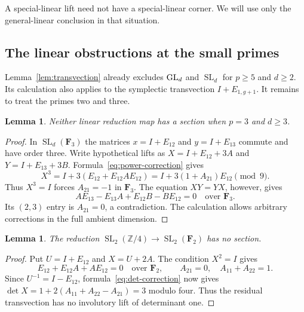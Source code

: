 \documentclass[11pt]{article}
\DeclareMathOperator{\SL}{SL}\DeclareMathOperator{\Sp}{Sp}
\newtheorem{lemma}[theorem]{Lemma}\newtheorem{proposition}[theorem]{Proposition}
\theoremstyle{definition}\newtheorem{definition}[theorem]{Definition}
\theoremstyle{remark}\newtheorem{remark}[theorem]{Remark}
\begin{document}
A special-linear lift need not have a special-linear corner. We will use
only the general-linear conclusion in that situation.

\subsection{The linear obstructions at the small primes}

Lemma~\ref{lem:transvection} already excludes $\operatorname{GL}_d$ and $\SL_d$ for
$p\geq5$ and $d\geq2$. Its calculation also applies to the symplectic
transvection $I+E_{1,g+1}$. It remains to treat the primes two and three.

\begin{lemma}\label{lem:three-linear}
Neither linear reduction map has a section when $p=3$ and $d\geq3$.
\end{lemma}
\begin{proof}
In $\SL_d(\mathbf F_3)$ the matrices $x=I+E_{12}$ and $y=I+E_{13}$
commute and have order three. Write hypothetical lifts as
$X=I+E_{12}+3A$ and $Y=I+E_{13}+3B$.
Formula~\eqref{eq:power-correction} gives
\[
 X^3=I+3(E_{12}+E_{12}AE_{12})
     =I+3(1+A_{21})E_{12}\pmod9.
\]
Thus $X^3=I$ forces $A_{21}=-1$ in $\mathbf F_3$.
The equation $XY=YX$, however, gives
\[
 AE_{13}-E_{13}A+E_{12}B-BE_{12}=0\quad\text{over }\mathbf F_3.
\]
Its $(2,3)$ entry is $A_{21}=0$, a contradiction. The calculation allows
arbitrary corrections in the full ambient dimension.
\end{proof}

\begin{lemma}\label{lem:two-two}
The reduction $\SL_2(\mathbb Z/4)\to\SL_2(\mathbf F_2)$ has no section.
\end{lemma}
\begin{proof}
Put $U=I+E_{12}$ and $X=U+2A$. The condition $X^2=I$ gives
\[
 E_{12}+E_{12}A+AE_{12}=0\quad\text{over }\mathbf F_2,
 \qquad A_{21}=0,\quad A_{11}+A_{22}=1.
\]
Since $U^{-1}=I-E_{12}$, formula~\eqref{eq:det-correction} now gives
$\det X=1+2(A_{11}+A_{22}-A_{21})=3$ modulo four. Thus the residual
transvection has no involutory lift of determinant one.
\end{proof}
\end{document}
